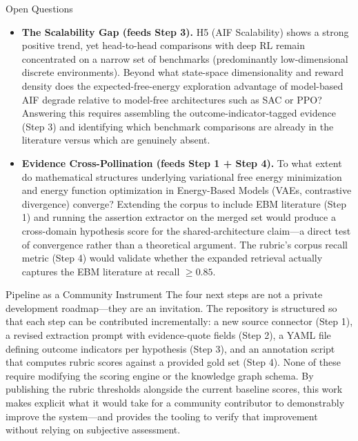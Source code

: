 \documentclass[
  ignorenonframetext,
]{beamer}
\begin{document}
\begin{frame}[allowframebreaks]{Open Questions}
\begin{itemize}
  tally into a decomposed ``invoked vs.~tested'' breakdown.
\item
  \textbf{The Scalability Gap (feeds Step 3).} H5 (AIF Scalability)
  shows a strong positive trend, yet head-to-head comparisons with deep
  RL remain concentrated on a narrow set of benchmarks (predominantly
  low-dimensional discrete environments). Beyond what state-space
  dimensionality and reward density does the expected-free-energy
  exploration advantage of model-based AIF degrade relative to
  model-free architectures such as SAC or PPO? Answering this requires
  assembling the outcome-indicator-tagged evidence (Step 3) and
  identifying which benchmark comparisons are already in the literature
  versus which are genuinely absent.
\item
  \textbf{Evidence Cross-Pollination (feeds Step 1 + Step 4).} To what
  extent do mathematical structures underlying variational free energy
  minimization and energy function optimization in Energy-Based Models
  (VAEs, contrastive divergence) converge? Extending the corpus to
  include EBM literature (Step 1) and running the assertion extractor on
  the merged set would produce a cross-domain hypothesis score for the
  shared-architecture claim---a direct test of convergence rather than a
  theoretical argument. The rubric's corpus recall metric (Step 4) would
  validate whether the expanded retrieval actually captures the EBM
  literature at recall \(\geq 0.85\).
\end{itemize}
\end{frame}

\begin{frame}[allowframebreaks]{Pipeline as a Community Instrument}
\protect{}\label{pipeline-as-a-community-instrument}
The four next steps are not a private development roadmap---they are an
invitation. The repository is structured so that each step can be
contributed incrementally: a new source connector (Step 1), a revised
extraction prompt with evidence-quote fields (Step 2), a YAML file
defining outcome indicators per hypothesis (Step 3), and an annotation
script that computes rubric scores against a provided gold set (Step 4).
None of these require modifying the scoring engine or the knowledge
graph schema. By publishing the rubric thresholds alongside the current
baseline scores, this work makes explicit what it would take for a
community contributor to demonstrably improve the system---and provides
the tooling to verify that improvement without relying on subjective
assessment.
\end{frame}
\end{document}

